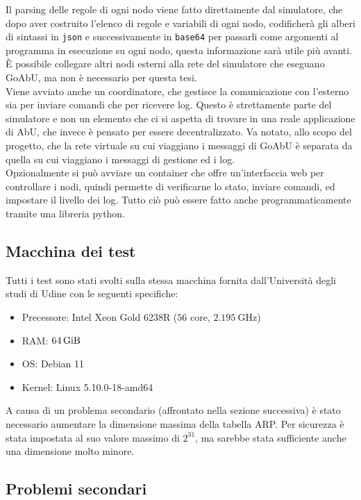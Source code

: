 \documentclass[12pt, a4paper]{article}
\begin{document}
Il parsing delle regole di ogni nodo viene fatto direttamente dal simulatore, che dopo aver costruito l'elenco di regole e variabili di ogni nodo, codificherà gli alberi di sintassi in \lstinline{json} e successivamente in \lstinline{base64} per passarli come argomenti al programma in esecuzione su ogni nodo, questa informazione sarà utile più avanti. È possibile collegare altri nodi esterni alla rete del simulatore che eseguano GoAbU, ma non è necessario per questa tesi.\\
Viene avviato anche un coordinatore, che gestisce la comunicazione con l'esterno sia per inviare comandi che per ricevere log. Questo è strettamente parte del simulatore e non un elemento che ci si aspetta di trovare in una reale applicazione di AbU, che invece è pensato per essere decentralizzato. Va notato, allo scopo del progetto, che la rete virtuale su cui viaggiano i messaggi di GoAbU è separata da quella su cui viaggiano i messaggi di gestione ed i log.\\
Opzionalmente si può avviare un container che offre un'interfaccia web per controllare i nodi, quindi permette di verificarne lo stato, inviare comandi, ed impostare il livello dei log. Tutto ciò può essere fatto anche programmaticamente tramite una libreria python.

\subsection{Macchina dei test}

Tutti i test sono stati svolti sulla stessa macchina fornita dall'Università degli studi di Udine con le seguenti specifiche:

\begin{itemize}
    \item Precessore: Intel Xeon Gold 6238R ($56$ core, $\qty{2.195}{\giga\hertz}$)
    \item RAM: $\qty{64}{\gibi\byte}$
    \item OS: Debian 11
    \item Kernel: Linux 5.10.0-18-amd64
\end{itemize}

A causa di un problema secondario (affrontato nella sezione successiva) è stato necessario aumentare la dimensione massima della tabella ARP. Per sicurezza è stata impostata al suo valore massimo di $2^{31}$, ma sarebbe stata sufficiente anche una dimensione molto minore.

\subsection{Problemi secondari}
\end{document}
